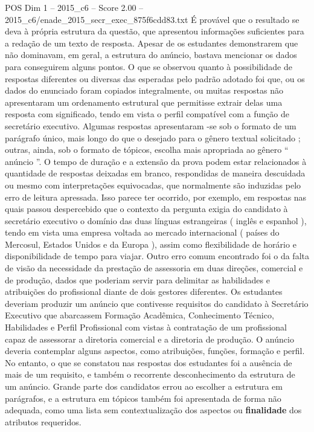 \begin{textsample}{POS Dim 1 – 2015\_c6 – Score 2.00 – 2015\_c6/enade\_2015\_secr\_exec\_875f6cdd83.txt}
É provável que o resultado se deva à própria estrutura da questão, que apresentou informações suficientes para a redação de um texto de resposta.
Apesar de os estudantes demonstrarem que não dominavam, em geral, a estrutura do anúncio, bastava mencionar os dados para conseguirem alguns pontos.
O que se observou quanto à possibilidade de respostas diferentes ou diversas das esperadas pelo padrão adotado foi que, ou os dados do enunciado foram copiados integralmente, ou muitas respostas não apresentaram um ordenamento estrutural que permitisse extrair delas uma resposta com significado, tendo em vista o perfil compatível com a função de secretário executivo.
Algumas respostas apresentaram -se sob o formato de um parágrafo único, mais longo do que o desejado para o gênero textual solicitado ; outras, ainda, sob o formato de tópicos, escolha mais apropriada ao gênero “ anúncio ”.
O tempo de duração e a extensão da prova podem estar relacionados à quantidade de respostas deixadas em branco, respondidas de maneira descuidada ou mesmo com interpretações equivocadas, que normalmente são induzidas pelo erro de leitura apressada.
Isso parece ter ocorrido, por exemplo, em respostas nas quais passou despercebido que o contexto da pergunta exigia do candidato à secretário executivo o domínio das duas línguas estrangeiras ( inglês e espanhol ), tendo em vista uma empresa voltada ao mercado internacional ( países do Mercosul, Estados Unidos e da Europa ), assim como flexibilidade de horário e disponibilidade de tempo para viajar.
Outro erro comum encontrado foi o da falta de visão da necessidade da prestação de assessoria em duas direções, comercial e de produção, dados que poderiam servir para delimitar as habilidades e atribuições do profissional diante de dois gestores diferentes.
Os estudantes deveriam produzir um anúncio que contivesse requisitos do candidato à Secretário Executivo que abarcassem Formação Acadêmica, Conhecimento Técnico, Habilidades e Perfil Profissional com vistas à contratação de um profissional capaz de assessorar a diretoria comercial e a diretoria de produção.
O anúncio deveria contemplar alguns aspectos, como atribuições, funções, formação e perfil.
No entanto, o que se constatou nas respostas dos estudantes foi a ausência de mais de um requisito, e também o recorrente desconhecimento da estrutura de um anúncio.
Grande parte dos candidatos errou ao escolher a estrutura em parágrafos, e a estrutura em tópicos também foi apresentada de forma não adequada, como uma lista sem contextualização dos aspectos ou \textbf{finalidade} dos atributos requeridos.

\end{textsample}
